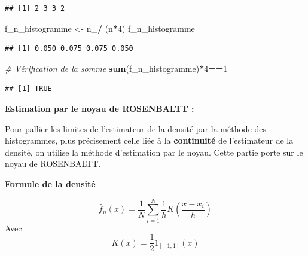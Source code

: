 \documentclass[
  12pt,
]{article}
\newenvironment{Shaded}{\begin{snugshade}}{\end{snugshade}}
\newcommand{\CommentTok}[1]{\textcolor[rgb]{0.56,0.35,0.01}{\textit{#1}}}
\newcommand{\DecValTok}[1]{\textcolor[rgb]{0.00,0.00,0.81}{#1}}
\newcommand{\FunctionTok}[1]{\textcolor[rgb]{0.13,0.29,0.53}{\textbf{#1}}}
\newcommand{\NormalTok}[1]{#1}
\newcommand{\OtherTok}[1]{\textcolor[rgb]{0.56,0.35,0.01}{#1}}
\newcommand{\SpecialCharTok}[1]{\textcolor[rgb]{0.81,0.36,0.00}{\textbf{#1}}}
\begin{document}
\begin{verbatim}
## [1] 2 3 3 2
\end{verbatim}

\begin{Shaded}
\begin{Highlighting}[]
\NormalTok{f\_n\_histogramme }\OtherTok{\textless{}{-}}\NormalTok{ n\_}\SpecialCharTok{/}\NormalTok{ (n}\SpecialCharTok{*}\DecValTok{4}\NormalTok{)}
\NormalTok{f\_n\_histogramme}
\end{Highlighting}
\end{Shaded}

\begin{verbatim}
## [1] 0.050 0.075 0.075 0.050
\end{verbatim}

\begin{Shaded}
\begin{Highlighting}[]
\CommentTok{\# Vérification de la somme }
\FunctionTok{sum}\NormalTok{(f\_n\_histogramme)}\SpecialCharTok{*}\DecValTok{4}\SpecialCharTok{==}\DecValTok{1}
\end{Highlighting}
\end{Shaded}

\begin{verbatim}
## [1] TRUE
\end{verbatim}

\textbf{Estimation par le noyau de ROSENBALTT :}

Pour pallier les limites de l'estimateur de la densité par la méthode
des histogrammes, plus précisement celle liée à la \textbf{continuité}
de l'estimateur de la densité, on utilise la méthode d'estimation par le
noyau. Cette partie porte sur le noyau de ROSENBALTT.

\textbf{Formule de la densité}

\[
\hat{f}_n(x)=\frac{1}{N}\sum_{i=1}^{N}\frac{1}{h}K(\frac{x-x_i}{h})
\] Avec \[ 
K(x)=\frac{1}{2}1_{[-1,1]}(x)
\]
\end{document}
